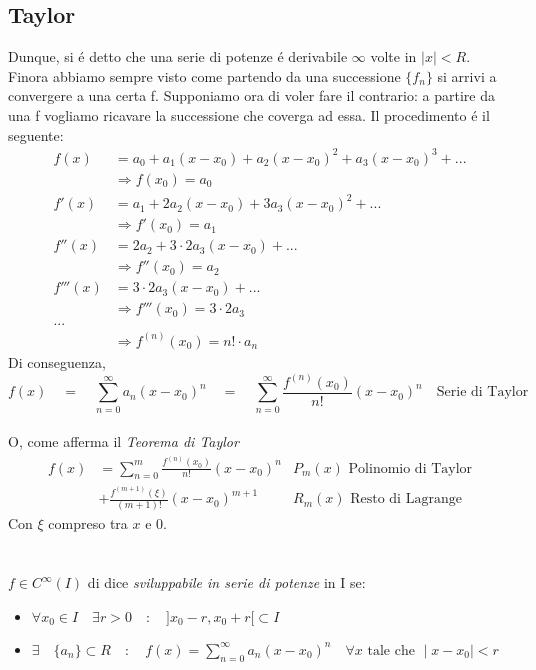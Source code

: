 \documentclass[a4paper,10pt,italian]{article}
\begin{document}
\subsection{Taylor}
Dunque, si \'e detto che una serie di potenze \'e derivabile $\infty$ volte in $\mid x \mid < R$. Finora abbiamo sempre visto
come partendo da una successione $\{f_n\}$ si arrivi a convergere a una certa f. Supponiamo ora di voler fare il contrario:
a partire da una f vogliamo ricavare la successione che coverga ad essa. Il procedimento \'e il seguente:
\begin{align*}
f(x) &= a_0 + a_1(x-x_0) + a_2(x-x_0)^2 + a_3(x-x_0)^3 + ... \\
&\Rightarrow f(x_0) = a_0 \\
f'(x) &= a_1 + 2a_2(x-x_0) + 3a_3(x-x_0)^2 + ... \\
&\Rightarrow f'(x_0) = a_1 \\
f''(x) &= 2a_2 + 3\cdot 2a_3(x-x_0) + ... \\
&\Rightarrow f''(x_0) = a_2 \\
f'''(x) &= 3\cdot 2a_3(x-x_0) + ... \\
&\Rightarrow f'''(x_0) = 3\cdot 2a_3 \\
... \\
&\Longrightarrow f^{(n)}(x_0) = n!\cdot a_n
\end{align*}
Di conseguenza, 
$$ f(x) \quad =\quad  \sum_{n=0}^{\infty} a_n(x-x_0)^n \quad = \quad \sum_{n=0}^{\infty} \frac{f^{(n)}(x_0)}{n!} (x-x_0)^n \quad \mbox{Serie di Taylor}$$ \\  
O, come afferma il \emph{Teorema di Taylor}
\begin{align*}
f(x) &= \sum_{n=0}^{m}\frac{f^{(n)}(x_0)}{n!}(x-x_0)^n &P_m(x) \mbox{ Polinomio di Taylor} \\
&+ \frac{f^{(m+1)}(\xi)}{(m+1)!}(x-x_0)^{m+1} &R_m(x) \mbox{ Resto di Lagrange}
\end{align*}
Con $\xi$ compreso tra $x$ e $0$. \\ \\ \\
$f \in C^\infty(I)$ di dice \emph{sviluppabile in serie di potenze} in I se:
\begin{itemize}
\item $\forall x_0 \in I \quad \exists r>0 \quad : \quad ]x_0-r, x_0+r[ \subset I$ 
\item $\exists \quad \{a_n\} \subset R \quad : \quad f(x)=\sum_{n=0}^{\infty}a_n(x-x_0)^n \quad \forall x \mbox{ tale che } \mid x-x_0 \mid < r$
\end{itemize}
\end{document}
